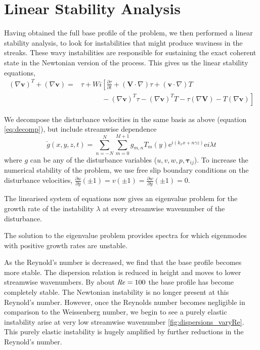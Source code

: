 \documentclass{jfm}
\newcommand{\dy}[1]{\frac{\partial #1}{\partial y}}
\newcommand{\me}{\mathrm{e}}
\newcommand\Rey{\mbox{\textit{Re}}}  %
\begin{document}
\section{Linear Stability Analysis}\label{sec:linear_stability}

Having obtained the full base profile of the problem, we then performed a
linear stability analysis, to look for instabilities that might produce
waviness in the streaks. These wavy instabilities are responsible for
sustaining the exact coherent state in the Newtonian version of the process.
This gives us the linear stability equations,
\begin{align}
(\nabla \mathbf{v})^T + (\nabla \mathbf{v}) =& \tau + Wi \left[ \frac{\partial \tau}{\partial t} + (\mathbf{V} \cdot \nabla) \tau + (\mathbf{v} \cdot \nabla) T \right.\\ 
& \left. \phantom{\tau + Wi} - (\nabla \mathbf{v})^T \tau - (\nabla \mathbf{v})^T T - \tau (\nabla \mathbf{V}) - T (\nabla \mathbf{v}) \right]
\end{align}

We decompose the disturbance velocities in the same basis as above (equation
\ref{eq:decomp}), but include streamwise dependence
\begin{equation}
    \check{g}(x,y,z,t) = \sum_{n=-N}^{N} \sum_{m=0}^{M+1} g_{m,n}  T_{m}(y) \me^{i(k_{x} x + n \gamma z)} \me{i\lambda t}\label{eq:decomp_disturbances}
\end{equation}
where $g$ can be any of the disturbance variables
($u,v,w,p,\boldsymbol{\tau}_{ij}$). To increase the numerical stability of the
problem, we use free slip boundary conditions on the disturbance velocities,
$\dy{u}(\pm1) = v(\pm 1) = \dy{w}(\pm1) = 0$.

The linearised system of equations now gives an eigenvalue problem for the
growth rate of the instability $\lambda$ at every streamwise wavenumber of the
disturbance.

The solution to the eigenvalue problem provides spectra for which eigenmodes
with positive growth rates are unstable.

As the Reynold's number is decreased, we find that the base profile becomes
more stable. The dispersion relation is reduced in height and moves to lower
streamwise wavenumbers. By about $\Rey = 100$ the base profile has become
completely stable. The Newtonian instability is no longer present at this
Reynold's number. However, once the Reynolds number becomes negligible in
comparison to the Weissenberg number, we begin to see a purely elastic
instability arise at very low streamwise wavenumber
\ref{fig:dispersions_varyRe}. This purely elastic instability is hugely
amplified by further reductions in the Reynold's number.
\end{document}
